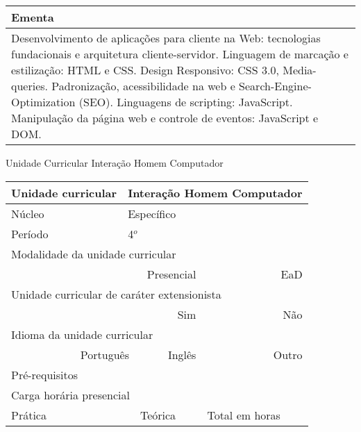 \begin{quadro}[ht!]
\begin{tabular}{|p{3cm} p{2cm} p{3cm} p{2cm} p{3cm} p{2cm}|}
\multicolumn{6}{|p{15cm}|}{\cellcolor{blue1} Ementa} \\\hline
\hline\multicolumn{6}{|p{15cm}|}{\scriptsize Desenvolvimento de aplicações para cliente na Web: tecnologias fundacionais e arquitetura cliente-servidor. Linguagem de marcação e estilização: HTML e CSS. Design Responsivo: CSS 3.0, Media-queries. Padronização, acessibilidade na web e Search-Engine-Optimization (SEO). Linguagens de scripting: JavaScript. Manipulação da página web e controle de eventos: JavaScript e DOM.}\\\hline 
\hline
	\end{tabular}
\end{quadro}


\begin{quadro}[ht!]
  \centering\scriptsize
\caption{Unidade Curricular Interação Homem Computador}
\begin{tabular}{|p{3cm} p{2cm} p{3cm} p{2cm} p{3cm} p{2cm}|}\hline
\multicolumn{1}{|p{3cm}|}{\cellcolor{blue1} Unidade curricular} & \multicolumn{5}{p{9cm}|}{Interação Homem Computador}\\\hline
\multicolumn{1}{|p{3cm}|}{\cellcolor{blue1} Núcleo} & \multicolumn{5}{p{11.5cm}|}{Específico}\\\hline
\multicolumn{1}{|p{3cm}|}{\cellcolor{blue1} Período} & \multicolumn{5}{p{9cm}|}{4$^o$}\\\hline
\multicolumn{6}{|p{15cm}|}{\cellcolor{blue1} Modalidade da unidade curricular} \\\hline
\multicolumn{2}{|r}{		} &  \multicolumn{2}{r}{Presencial \XBox} & \multicolumn{2}{r|}{EaD \Square	} \\\hline
\multicolumn{6}{|p{15cm}|}{\cellcolor{blue1} Unidade curricular de caráter extensionista} \\\hline
\multicolumn{4}{|r}{			Sim \XBox	} & \multicolumn{2}{r|}{	Não \Square	}\\\hline
\multicolumn{6}{|p{15cm}|}{\cellcolor{blue1} Idioma da unidade curricular} \\ \hline
\multicolumn{2}{|r}{	Português \XBox	} &  \multicolumn{2}{r}{	Inglês \Square	} & \multicolumn{2}{r|}{	Outro \Square	} \\ \hline
\multicolumn{1}{|p{3cm}|}{\cellcolor{blue1} Pré-requisitos} & \multicolumn{5}{p{9cm}|}{}\\ \hline
\multicolumn{6}{|p{15cm}|}{\cellcolor{blue1} Carga horária presencial} \\ \hline
\multicolumn{1}{|p{3cm}|}{\raggedleft Prática} & \multicolumn{1}{p{1cm}|}{\centering	15	} &  \multicolumn{1}{p{3cm}|}{\raggedleft Teórica}  & \multicolumn{1}{p{1cm}|}{\centering 	15	} & \multicolumn{1}{p{3cm}|}{\raggedleft Total em horas} & \multicolumn{1}{p{1cm}|}{\raggedleft	30	} \\ \hline 

\end{tabular}
\end{quadro}
